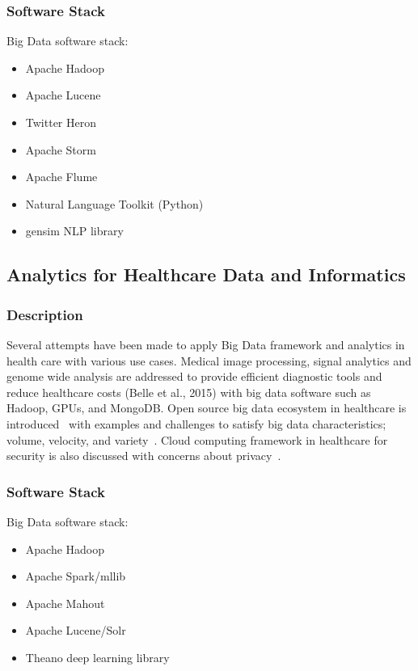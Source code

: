 \documentclass[9pt,twocolumn,twoside]{styles/osajnl}
\begin{document}
\begin{table}[htb]
\subsubsection{Software Stack}

Big Data software stack:

\begin{itemize}
\item Apache Hadoop
\item Apache Lucene
\item Twitter Heron
\item Apache Storm
\item Apache Flume
\item Natural Language Toolkit (Python)
\item gensim NLP library
\end{itemize}



\subsection{Analytics for Healthcare Data and Informatics}

\subsubsection{Description}

Several attempts have been made to apply Big Data framework and
analytics in health care with various use cases. Medical image
processing, signal analytics and genome wide analysis are addressed to
provide efficient diagnostic tools and reduce healthcare costs (Belle
et al., 2015) with big data software such as Hadoop, GPUs, and
MongoDB. Open source big data ecosystem in healthcare is
introduced~\cite{raghupathi2014big} with examples and challenges to satisfy big
data characteristics; volume, velocity, and
variety~\cite{zikopoulos2011understanding}. Cloud computing framework in
healthcare for security is also discussed with concerns about
privacy~\cite{stantchev2014cloud}.


\subsubsection{Software Stack}

Big Data software stack:

\begin{itemize}
\item Apache Hadoop
\item Apache Spark/mllib
\item Apache Mahout
\item Apache Lucene/Solr
\item Theano deep learning library
\end{itemize}




\end{table}
\end{document}
